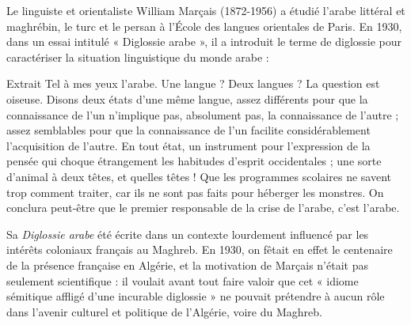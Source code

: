 

Le linguiste et orientaliste William Marçais (1872-1956) a étudié l’arabe littéral et maghrébin, le turc et le persan à l’École des langues orientales de Paris. En 1930, dans un essai intitulé « Diglossie arabe », il a introduit le terme de diglossie pour caractériser la situation linguistique du monde arabe :


\begin{lecture}{Extrait}
Tel à mes yeux l’arabe. Une langue ? Deux langues ? La question est oiseuse. Disons deux états d’une même langue, assez différents pour que la connaissance de l’un n’implique pas, absolument pas, la connaissance de l’autre ; assez semblables pour que la connaissance de l’un facilite considérablement l’acquisition de l’autre. En tout état, un instrument pour l’expression de la pensée qui choque étrangement les habitudes d’esprit occidentales ; une sorte d’animal à deux têtes, et quelles têtes ! Que les programmes scolaires ne savent trop comment traiter, car ils ne sont pas faits pour héberger les monstres. On conclura peut-être que le premier responsable de la crise de l’arabe, c’est l’arabe.
\end{lecture}

Sa \emph{Diglossie arabe} été écrite dans un contexte lourdement influencé par les intérêts coloniaux français au Maghreb. En 1930, on fêtait en effet le centenaire de la présence française en Algérie, et la motivation de Marçais n’était pas seulement scientifique : il voulait avant tout faire valoir que cet « idiome sémitique affligé d’une incurable diglossie » ne pouvait prétendre à aucun rôle dans l’avenir culturel et politique de l’Algérie, voire du Maghreb.

